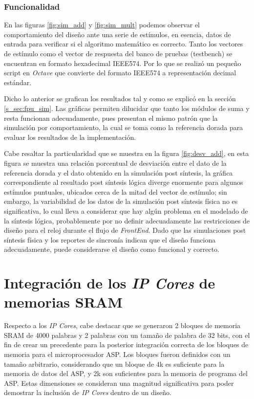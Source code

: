 \subsubsection{Funcionalidad}

En las figuras \ref{fig:sim_add} y \ref{fig:sim_mult} podemos observar el comportamiento del diseño ante una serie de estímulos, en esencia, datos de entrada para verificar si el algoritmo matemático es correcto. Tanto los vectores de estímulo como el vector de respuesta del banco de pruebas (testbench) se encuentran en formato hexadecimal IEEE574. Por lo que se realizó un pequeño script en \textit{Octave} que convierte del formato IEEE574 a representación decimal estándar.

Dicho lo anterior se grafican los resultados tal y como se explicó en la sección \ref{s_sec:fpu_sim}. Las gráficas permiten dilucidar que tanto los módulos de suma y resta funcionan adecuadamente, pues presentan el mismo patrón que la simulación por comportamiento, la cual se toma como la referencia dorada para evaluar los resultados de la implementación. 

Cabe resaltar la particularidad que se muestra en la figura \ref{fig:desv_add}, en esta figura se muestra una relación porcentual de desviación entre el dato de la referencia dorada y el dato obtenido en la simulación post síntesis, la gráfica correspondiente al resultado post síntesis lógica diverge enormente para algunos estímulos puntuales, ubicados cerca de la mitad del vector de estímulo; sin embargo, la variabilidad de los datos de la simulación post síntesis física no es significativa, lo cual lleva a considerar que hay algún problema en el modelado de la síntesis lógica, probablemente por no definir adecuadamente las restricciones de diseño para el reloj durante el flujo de \textit{FrontEnd}. Dado que las simulaciones post síntesis física y los reportes de sincronía indican que el diseño funciona adecuadamente, puede considerarse el diseño como funcional y correcto.


\section{Integración de los \textit{IP Cores} de memorias SRAM}

Respecto a los \textit{IP Cores}, cabe destacar que se generaron 2 bloques de memoria SRAM de 4000 palabras y 2 palabras con un tamaño de palabra de 32 bits, con el fin de crear un precedente para la posterior integración correcta de los bloques de memoria para el microprocesador ASP. Los bloques fueron definidos con un tamaño arbitrario, considerando que un bloque de 4k es suficiente para la memoria de datos del ASP, y 2k son suficientes para la memoria de programa del ASP. Estas dimensiones se consideran una magnitud significativa para poder demostrar la inclusión de \textit{IP Cores} dentro de un diseño.

